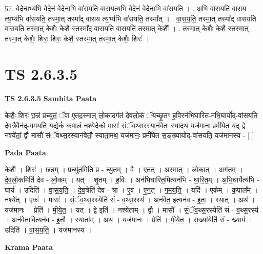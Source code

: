 \documentclass[17pt]{extarticle}
\begin{document}
57. वे॒देना॒भ्य॑भि वे॒देन॑ वे॒देना॒भि वा॑सयति वासयत्य॒भि वे॒देन॑ वे॒देना॒भि वा॑सयति । . अ॒भि वा॑सयति वासय त्य॒भ्य॑भि वा॑सयति॒ तस्मा॒त् तस्मा᳚द् वासय त्य॒भ्य॑भि वा॑सयति॒ तस्मा᳚त् । . वा॒स॒य॒ति॒ तस्मा॒त् तस्मा᳚द् वासयति वासयति॒ तस्मा॒त् केशैः॒ केशै॒ स्तस्मा᳚द् वासयति वासयति॒ तस्मा॒त् केशैः᳚ । . तस्मा॒त् केशैः॒ केशै॒ स्तस्मा॒त् तस्मा॒त् केशैः॒ शिरः॒ शिरः॒ केशै॒ स्तस्मा॒त् तस्मा॒त् केशैः॒ शिरः॑ । \newline
\pagebreak
{}

\section{ TS 2.6.3.5 }

\textbf{TS 2.6.3.5 } \newline
\textbf{Samhita Paata} \newline

केशैः॒ शिरः॑ छ॒न्नं प्रच्यु॑तं॒ ॅवा ए॒तद॒स्माल् लो॒कादग॑तं देवलो॒कं ॅयच्छृ॒तꣳ ह॒विरन॑भिघारित-मभि॒घार्योद्-वा॑सयति देव॒त्रैवैन॑द्-गमयति॒ यद्येकं॑ क॒पालं॒ नश्ये॒देको॒ मासः॑ संॅवथ्स॒रस्यान॑वेतः॒ स्यादथ॒ यज॑मानः॒ प्रमी॑येत॒ यद् द्वे नश्ये॑तां॒ द्वौ मासौ॑ संॅवथ्स॒रस्यान॑वेतौ॒ स्याता॒मथ॒ यज॑मानः॒ प्रमी॑येत स॒ङ्ख्यायोद्-वा॑सयति॒ यज॑मानस्य - [  ] \newline

\textbf{Pada Paata} \newline

केशैः᳚ । शिरः॑ । छ॒न्नम् । प्रच्यु॑त॒मिति॒ प्र - च्यु॒त॒म् । वै । ए॒तत् । अ॒स्मात् । लो॒कात् । अग॑तम् । दे॒व॒लो॒कमिति॑ देव - लो॒कम् । यत् । शृ॒तम् । ह॒विः । अन॑भिघारित॒मित्यन॑भि - घा॒रि॒त॒म् । अ॒भि॒घार्येत्य॑भि - घार्य॑ । उदिति॑ । वा॒स॒य॒ति॒ । दे॒व॒त्रेति॑ देव - त्रा । ए॒व । ए॒न॒त् । ग॒म॒य॒ति॒ । यदि॑ । एक᳚म् । क॒पाल᳚म् । नश्ये᳚त् । एकः॑ । मासः॑ । सं॒ॅव॒थ्स॒रस्येति॑ सं - व॒थ्स॒रस्य॑ । अन॑वेत॒ इत्यन॑व - इ॒तः॒ । स्यात् । अथ॑ । यज॑मानः । प्रेति॑ । मी॒ये॒त॒ । यत् । द्वे इति॑ । नश्ये॑ताम् । द्वौ । मासौ᳚ । सं॒ॅव॒थ्स॒रस्येति॑ सं - व॒थ्स॒रस्य॑ । अन॑वेता॒वित्यन॑व - इ॒तौ॒ । स्याता᳚म् । अथ॑ । यज॑मानः । प्रेति॑ । मी॒ये॒त॒ । स॒ख्यांयेति॑ सं - ख्याय॑ । उदिति॑ । वा॒स॒य॒ति॒ । यज॑मानस्य ।  \newline


\textbf{Krama Paata} \newline
\end{document}
